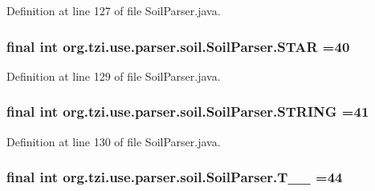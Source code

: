 Definition at line 127 of file Soil\-Parser.\-java.

\hypertarget{classorg_1_1tzi_1_1use_1_1parser_1_1soil_1_1_soil_parser_a4bebb8f71fc88077fa077dec646d38ef}{
\subsubsection[{S\-T\-A\-R}]{\setlength{\rightskip}{0pt plus 5cm}final int org.\-tzi.\-use.\-parser.\-soil.\-Soil\-Parser.\-S\-T\-A\-R =40\hspace{0.3cm}{\ttfamily [static]}}}\label{classorg_1_1tzi_1_1use_1_1parser_1_1soil_1_1_soil_parser_a4bebb8f71fc88077fa077dec646d38ef}


Definition at line 129 of file Soil\-Parser.\-java.

\hypertarget{classorg_1_1tzi_1_1use_1_1parser_1_1soil_1_1_soil_parser_ac9099ceb3e0b4b4be0d899517cdb9c1a}{
\subsubsection[{S\-T\-R\-I\-N\-G}]{\setlength{\rightskip}{0pt plus 5cm}final int org.\-tzi.\-use.\-parser.\-soil.\-Soil\-Parser.\-S\-T\-R\-I\-N\-G =41\hspace{0.3cm}{\ttfamily [static]}}}\label{classorg_1_1tzi_1_1use_1_1parser_1_1soil_1_1_soil_parser_ac9099ceb3e0b4b4be0d899517cdb9c1a}


Definition at line 130 of file Soil\-Parser.\-java.

\hypertarget{classorg_1_1tzi_1_1use_1_1parser_1_1soil_1_1_soil_parser_a1de3c998a69de3ad8970470536efb137}{
\subsubsection[{T\-\_\-\-\_\-44}]{\setlength{\rightskip}{0pt plus 5cm}final int org.\-tzi.\-use.\-parser.\-soil.\-Soil\-Parser.\-T\-\_\-\-\_ =44\hspace{0.3cm}{\ttfamily [static]}}}\label{classorg_1_1tzi_1_1use_1_1parser_1_1soil_1_1_soil_parser_a1de3c998a69de3ad8970470536efb137}


